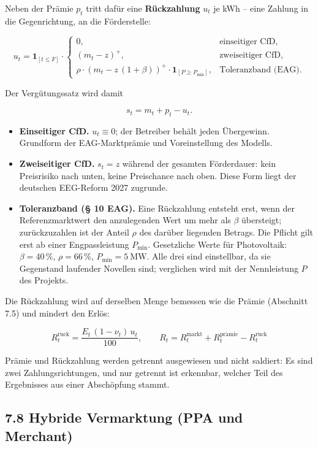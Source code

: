 \documentclass[
  a4paper,
  10pt]{article}
\providecommand{\tightlist}{%
  \setlength{\itemsep}{0pt}\setlength{\parskip}{0pt}}
\begin{document}
Neben der Prämie \(p_t\) tritt dafür eine \textbf{Rückzahlung} \(u_t\)
je kWh -- eine Zahlung in die Gegenrichtung, an die Förderstelle:

\[
u_t = \mathbf{1}_{[t\leq F]} \cdot
\begin{cases}
0, & \text{einseitiger CfD},\\[2pt]
\left(m_t-z\right)^+, & \text{zweiseitiger CfD},\\[2pt]
\rho\cdot\left(m_t-z\,(1+\beta)\right)^+\cdot\mathbf{1}_{[P\geq P_{\min}]}, & \text{Toleranzband (EAG)}.
\end{cases}
\]

Der Vergütungssatz wird damit

\[ s_t = m_t + p_t - u_t. \]

\begin{itemize}
\tightlist
\item
  \textbf{Einseitiger CfD.} \(u_t \equiv 0\); der Betreiber behält jeden
  Übergewinn. Grundform der EAG-Marktprämie und Voreinstellung des
  Modells.
\item
  \textbf{Zweiseitiger CfD.} \(s_t = z\) während der gesamten
  Förderdauer: kein Preisrisiko nach unten, keine Preischance nach oben.
  Diese Form liegt der deutschen EEG-Reform 2027 zugrunde.
\item
  \textbf{Toleranzband (§ 10 EAG).} Eine Rückzahlung entsteht erst, wenn
  der Referenzmarktwert den anzulegenden Wert um mehr als \(\beta\)
  übersteigt; zurückzuzahlen ist der Anteil \(\rho\) des darüber
  liegenden Betrags. Die Pflicht gilt erst ab einer Engpassleistung
  \(P_{\min}\). Gesetzliche Werte für Photovoltaik: \(\beta = 40\,\%\),
  \(\rho = 66\,\%\), \(P_{\min} = 5\ \mathrm{MW}\). Alle drei sind
  einstellbar, da sie Gegenstand laufender Novellen sind; verglichen
  wird mit der Nennleistung \(P\) des Projekts.
\end{itemize}

Die Rückzahlung wird auf derselben Menge bemessen wie die Prämie
(Abschnitt 7.5) und mindert den Erlös:

\[ R^{\mathrm{r\ddot{u}ck}}_t = \frac{E_t\,(1-\nu_t)\,u_t}{100}, \qquad R_t = R^{\mathrm{markt}}_t + R^{\mathrm{pr\ddot{a}mie}}_t - R^{\mathrm{r\ddot{u}ck}}_t \]

Prämie und Rückzahlung werden getrennt ausgewiesen und nicht saldiert:
Es sind zwei Zahlungsrichtungen, und nur getrennt ist erkennbar, welcher
Teil des Ergebnisses aus einer Abschöpfung stammt.

\hypertarget{hybride-vermarktung-ppa-und-merchant}{%
\subsection{7.8 Hybride Vermarktung (PPA und
Merchant)}\label{hybride-vermarktung-ppa-und-merchant}}
\end{document}
